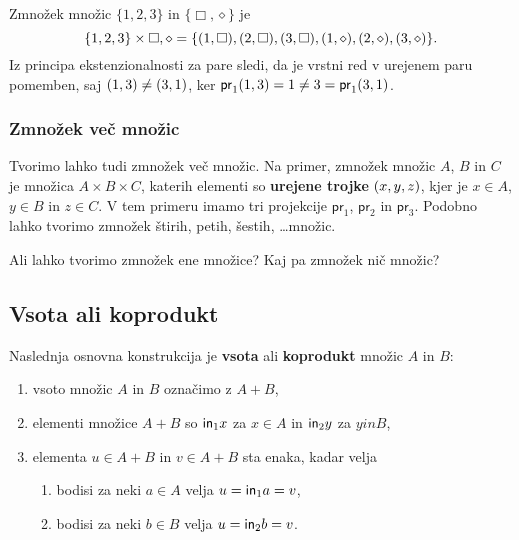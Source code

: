\begin{primer}
Zmnožek množic $\{1,2,3\}$ in $\{\Box, \diamond\}$ je
%
\begin{equation*}
    \{1, 2, 3\} \times {\Box, \diamond} =
    \{(1, \Box),
      (2, \Box),
      (3, \Box),
      (1, \diamond),
      (2, \diamond),
      (3, \diamond)
     \}.
\end{equation*}
%
Iz principa ekstenzionalnosti za pare sledi, da je vrstni red v urejenem paru pomemben, saj $(1, 3) \neq (3, 1)$, ker $\mathsf{pr}_1(1,3) = 1 \neq 3 = \mathsf{pr}_1(3,1)$.
\end{primer}


\subsubsection{Zmnožek več množic}

Tvorimo lahko tudi zmnožek več množic. Na primer, zmnožek množic $A$, $B$ in $C$ je množica $A \times B \times C$, katerih elementi so \textbf{urejene trojke} $(x, y, z)$, kjer je $x \in A$, $y \in B$ in $z \in C$. V tem primeru imamo tri projekcije $\mathsf{pr}_1$, $\mathsf{pr}_2$ in $\mathsf{pr}_3$. Podobno lahko tvorimo zmnožek štirih, petih, šestih, \dots množic.

\begin{naloga}
  Ali lahko tvorimo zmnožek ene množice? Kaj pa zmnožek nič množic?
\end{naloga}


\subsection{Vsota ali koprodukt}

Naslednja osnovna konstrukcija je \textbf{vsota} ali \textbf{koprodukt} množic $A$ in $B$:
%
\begin{enumerate}
\item vsoto množic $A$ in $B$ označimo z $A + B$,
\item elementi množice $A + B$ so $\mathsf{in}_{1}{x}$ za $x \in A$ in $\mathsf{in}_{2}{y}$ za $y in B$,
\item elementa $u \in A + B$ in $v \in A + B$ sta enaka, kadar velja
  \begin{enumerate}
    \item bodisi za neki $a \in A$ velja $u = \mathsf{in}_{1}{a} = v$,
    \item bodisi za neki $b \in B$ velja $u = \mathsf{in}_{2}{b} = v$.
  \end{enumerate}
\end{enumerate}

